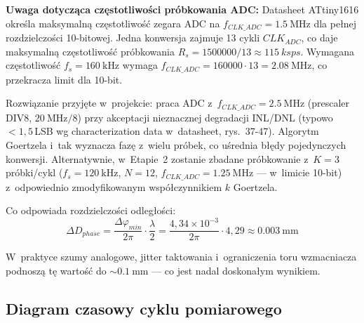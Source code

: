 \documentclass[a4paper,11pt]{article}
\begin{document}
\textbf{Uwaga dotycząca częstotliwości próbkowania ADC:}
Datasheet ATtiny1616 określa maksymalną częstotliwość zegara ADC na
$f_{CLK\_ADC} = \SI{1,5}{\mega\hertz}$ dla pełnej rozdzielczości 10-bitowej.
Jedna konwersja zajmuje 13 cykli $CLK_{ADC}$, co daje maksymalną częstotliwość
próbkowania $R_s = 1500000/13 \approx \SI{115}{ksps}$. Wymagana częstotliwość
$f_s = \SI{160}{\kilo\hertz}$ wymaga $f_{CLK\_ADC} = 160000 \cdot 13 = \SI{2,08}{\mega\hertz}$,
co przekracza limit dla 10-bit.

Rozwiązanie przyjęte w~projekcie: praca ADC z~$f_{CLK\_ADC} = \SI{2,5}{\mega\hertz}$
(prescaler DIV8, $\SI{20}{\mega\hertz}/8$) przy akceptacji nieznacznej degradacji
INL/DNL (typowo $< 1{,}5$\,LSB wg characterization data w~datasheet, rys.~37-47).
Algorytm Goertzela i~tak wyznacza fazę z~wielu próbek, co uśrednia błędy
pojedynczych konwersji. Alternatywnie, w~Etapie~2 zostanie zbadane próbkowanie
z~$K = 3$ próbki/cykl ($f_s = \SI{120}{\kilo\hertz}$, $N = 12$, $f_{CLK\_ADC} = \SI{1,25}{\mega\hertz}$
--- w~limicie 10-bit) z~odpowiednio zmodyfikowanym współczynnikiem $k$ Goertzela.

Co odpowiada rozdzielczości odległości:
\begin{equation}
    \Delta D_{phase} = \frac{\Delta\varphi_{min}}{2\pi} \cdot \frac{\lambda}{2}
    = \frac{4{,}34 \times 10^{-3}}{2\pi} \cdot 4{,}29 \approx \SI{0,003}{\milli\metre}
    \label{eq:phase_dist_res}
\end{equation}

W~praktyce szumy analogowe, jitter taktowania i~ograniczenia toru wzmacniacza
podnoszą tę wartość do ${\sim}\SI{0,1}{\milli\metre}$ --- co jest nadal doskonałym
wynikiem.

\subsection{Diagram czasowy cyklu pomiarowego}
\end{document}
